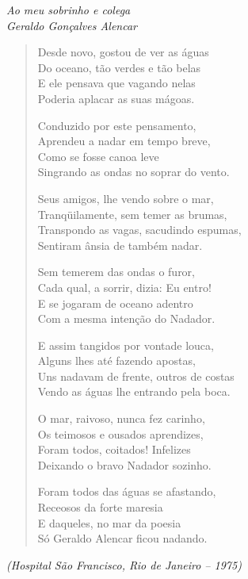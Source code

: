\begin{flushright}
\emph{Ao meu sobrinho e colega}\\
\emph{Geraldo Gonçalves Alencar}
\end{flushright}

\begin{verse}
Desde novo, gostou de ver as águas\\
Do oceano, tão verdes e tão belas\\
E ele pensava que vagando nelas\\
Poderia aplacar as suas mágoas.

Conduzido por este pensamento,\\
Aprendeu a nadar em tempo breve,\\
Como se fosse canoa leve\\
Singrando as ondas no soprar do vento.

Seus amigos, lhe vendo sobre o mar,\\
Tranqüilamente, sem temer as brumas,\\
Transpondo as vagas, sacudindo espumas,\\
Sentiram ânsia de também nadar.

Sem temerem das ondas o furor,\\
Cada qual, a sorrir, dizia: Eu entro!\\
E se jogaram de oceano adentro\\
Com a mesma intenção do Nadador.

E assim tangidos por vontade louca,\\
Alguns lhes até fazendo apostas,\\
Uns nadavam de frente, outros de costas\\
Vendo as águas lhe entrando pela boca.

O mar, raivoso, nunca fez carinho,\\
Os teimosos e ousados aprendizes,\\
Foram todos, coitados! Infelizes\\
Deixando o bravo Nadador sozinho.

Foram todos das águas se afastando,\\
Receosos da forte maresia\\
E daqueles, no mar da poesia\\
Só Geraldo Alencar ficou nadando.
\end{verse}

\begin{flushright}
\emph{(Hospital São Francisco, Rio de Janeiro -- 1975)}
\end{flushright}

